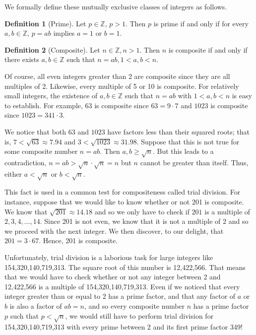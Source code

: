 \documentclass[10pt, titlepage]{amsart}
\newcommand\Z{{\mathbb Z}}
\theoremstyle{definition}
\newtheorem{definition}{Definition}[subsection]
\begin{document}
	We formally define these mutually exclusive classes of integers as follows.
	\begin{definition}[Prime]\label{definition:prime}
		Let $p \in \Z$, $p > 1$. Then $p$ is prime if and only if for every $a, b \in \Z$, $p=ab$ implies $a=1$ or $b=1$. \cite{pommersheim}
	\end{definition}
	\begin{definition}[Composite]\label{definition:composite}
		Let $n \in \Z, n > 1$. Then $n$ is composite if and only if there exists $a, b \in \Z$ such that $n=ab, 1<a,b<n$. \cite{pommersheim}
	\end{definition}
	
	Of course, all even integers greater than 2 are composite since they are all multiples of 2. Likewise, every multiple of 5 or 10 is composite. For relatively small integers, the existence of $a, b \in \Z$ such that $n=ab$ with $1<a,b<n$ is easy to establish. For example, $63$ is composite since $63 = 9 \cdot 7$ and $1023$ is composite since $1023 = 341 \cdot 3$. 
	
	We notice that both $63$ and $1023$ have factors less than their squared roots; that is, $7 < \sqrt{63} \approx 7.94$ and $3 < \sqrt{1023} \approx 31.98$. Suppose that this is not true for some composite number $n = ab$. Then $a,b \geq \sqrt{n}$. But this leads to a contradiction, $n = ab > \sqrt{n} \cdot \sqrt{n} = n$ but $n$ cannot be greater than itself. Thus, either $a < \sqrt{n}$ or $b < \sqrt{n}$. 
	
	
	This fact is used in a common test for compositeness called trial division. For instance, suppose that we would like to know whether or not 201 is composite. We know that $\sqrt{201} \approx 14.18$ and so we only have to check if $201$ is a multiple of $2, 3, 4, \ldots, 14$. Since 201 is not even, we know that it is not a multiple of $2$ and so we proceed with the next integer. We then discover, to our delight, that $201 = 3 \cdot 67$. Hence, 201 is composite. 
	
	Unfortunately, trial division is a laborious task for large integers like 154,320,140,719,313. The square root of this number is 12,422,566. That means that we would have to check whether or not any integer between 2 and 12,422,566 is a multiple of 154,320,140,719,313. Even if we noticed that every integer greater than or equal to 2 has a prime factor, and that any factor of $a$ or $b$ is also a factor of $ab = n$, and so every composite number $n$ has a prime factor $p$ such that $p < \sqrt{n}$, we would still have to perform trial division for 154,320,140,719,313 with every prime between 2 and its first prime factor 349! 
	
\end{document}
